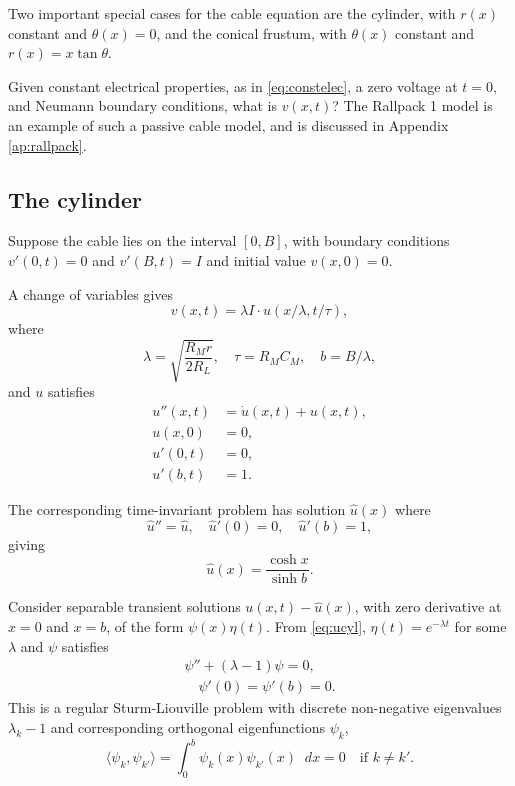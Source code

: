 \documentclass[parskip=half]{scrartcl}
\newcommand{\Int}[2]{\int_{#1}^{#2}\!}
\newcommand{\D}{\mathop{}\!d}
\theoremstyle{nonumberplain}
\begin{document}
Two important special cases for the cable equation are the cylinder,
with $r(x)$ constant and $\theta(x)=0$, and the conical frustum,
with $\theta(x)$ constant and $r(x)=x\tan\theta$.

Given constant electrical properties, as in \eqref{eq:constelec},
a zero voltage at $t=0$, and Neumann boundary conditions, what
is $v(x, t)$? The Rallpack 1 model \autocite{bhalla1992} is
an example of such a passive cable model, and is discussed in
Appendix \ref{ap:rallpack}.

\subsection{The cylinder}

Suppose the cable lies on the interval $[0, B]$, with boundary
conditions $v'(0, t) = 0$ and $v'(B, t) = I$ and initial value
$v(x, 0) = 0$.

A change of variables gives
\begin{equation}
    v(x, t) = \lambda I\cdot u(x/\lambda, t/\tau),
\end{equation}
where
\begin{equation}
    \lambda = \sqrt{\frac{R_M r}{2 R_L}}, \quad \tau = R_M C_M, \quad b = B/\lambda,
\end{equation}
and $u$ satisfies
\begin{equation}
    \begin{aligned}
        u''(x, t) &= \dot u(x, t) + u(x, t),\\
        u(x, 0) &= 0,\\
        u'(0, t) &= 0,\\
        u'(b, t) &= 1.
    \end{aligned}
    \label{eq:ucyl}
\end{equation}

The corresponding time-invariant problem has solution $\hat u(x)$ where
\begin{equation}
    \hat u'' = \hat u,\quad \hat u'(0) = 0,\quad \hat u'(b) = 1,
\end{equation}
giving
\begin{equation}
    \hat u(x) = \frac{\cosh x}{\sinh b}.
\end{equation}

Consider separable transient solutions $u(x,t)-\hat u(x)$, with zero derivative
at $x=0$ and $x=b$, of the form $\psi(x)\eta(t)$. From \eqref{eq:ucyl},
$\eta(t)=e^{-\lambda t}$ for some $\lambda$ and $\psi$ satisfies
\begin{gather}
    \label{eq:efncyl}
    \psi'' + (\lambda-1)\psi = 0,\\
    \label{eq:efncylbc}
    \quad \psi'(0)=\psi'(b)=0.
\end{gather}
This is a regular Sturm-Liouville problem
\autocite[see e.g.][Theorem~2.1, p.~146]{reid1980} with discrete non-negative eigenvalues
$\lambda_k-1$ and corresponding orthogonal eigenfunctions $\psi_k$,
\begin{equation}
    \langle \psi_k, \psi_{k'} \rangle =
    \Int{0}{b} \psi_k(x)\psi_{k'}(x) \D x =0\quad\text{if $k\neq k'$}.
\end{equation}
\end{document}
